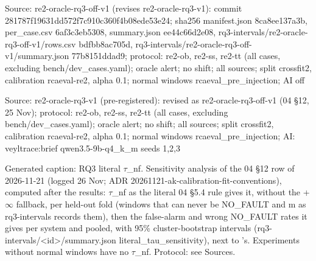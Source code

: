 \noindent Source: re2-oracle-rq3-off-v1 (revises re2-oracle-rq3-v1): commit 281787f19631dd572f7c910c360f4b08ede53e24; sha256 manifest.json 8ca8ee137a3b, per\_case.csv 6af3c3eb5308, summary.json ee44c66d2e08, rq3-intervals/\allowbreak{}re2-oracle-rq3-off-v1/\allowbreak{}rows.csv bdfbb8ac705d, rq3-intervals/\allowbreak{}re2-oracle-rq3-off-v1/\allowbreak{}summary.json 77b8151ddad9; protocol: re2-ob, re2-ss, re2-tt (all cases, excluding bench/\allowbreak{}dev\_cases.yaml); oracle alert; no shift; all sources; split crossfit2, calibration rcaeval-re2, alpha 0.1; normal windows rcaeval\_pre\_injection; AI off\par
\noindent Source: re2-oracle-rq3-v1 (pre-registered): revised as re2-oracle-rq3-off-v1 (04 \S{}12, 25 Nov); protocol: re2-ob, re2-ss, re2-tt (all cases, excluding bench/\allowbreak{}dev\_cases.yaml); oracle alert; no shift; all sources; split crossfit2, calibration rcaeval-re2, alpha 0.1; normal windows rcaeval\_pre\_injection; AI: veyltrace:brief qwen3.5-9b-q4\_k\_m seeds 1,2,3\par
\noindent Generated caption: RQ3 literal $\tau$\_nf. Sensitivity analysis of the 04 \S{}12 row of 2026-11-21 (logged 26 Nov; ADR 20261121-ak-calibration-fit-conventions), computed after the results: $\tau$\_nf as the literal 04 \S{}5.4 rule gives it, without the +$\infty$ fallback, per held-out fold (windows that can never be NO\_FAULT and m as rq3-intervals records them), then the false-alarm and wrong NO\_FAULT rates it gives per system and pooled, with 95\% cluster-bootstrap intervals (rq3-intervals/\allowbreak{}\textless{}id\textgreater{}/\allowbreak{}summary.json literal\_tau\_sensitivity), next to 's. Experiments without normal windows have no $\tau$\_nf. Protocol: see Sources.\par
\endgroup
